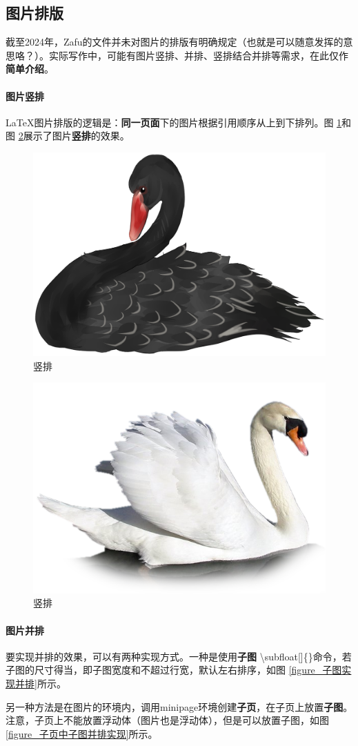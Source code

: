 \documentclass[AutoFakeBold]{ZafuThesis}
\begin{document}
\subsection{图片排版}
截至2024年，Zafu的文件并未对图片的排版有明确规定（也就是可以随意发挥的意思咯？）。实际写作中，可能有图片竖排、并排、竖排结合并排等需求，在此仅作\textbf{简单介绍}。
\paragraph{图片竖排}
\LaTeX 图片排版的逻辑是：\textbf{同一页面}下的图片根据引用顺序从上到下排列。图 \ref{figures_sp0}和图 \ref{figures_sp1}展示了图片\textbf{竖排}的效果。\par
\begin{figure}[htbp]
  \centering
  \includegraphics[width=0.26\columnwidth]{figures/黑天鹅}
  \caption{竖排}
  \label{figures_sp0}
\end{figure}
\begin{figure}[htbp]
  \centering
  \includegraphics[width=0.3\columnwidth]{figures/白天鹅}
  \caption{竖排}
  \label{figures_sp1}
\end{figure}

\paragraph{图片并排}
要实现并排的效果，可以有两种实现方式。一种是使用\textbf{子图} \textbackslash subfloat[]\{\}命令，若子图的尺寸得当，即子图宽度和不超过行宽，默认左右排序，如图 \ref{figure_子图实现并排}所示。\par
另一种方法是在图片的环境内，调用minipage环境创建\textbf{子页}，在子页上放置\textbf{子图}。注意，子页上不能放置浮动体（图片也是浮动体），但是可以放置子图，如图 \ref{figure_子页中子图并排实现}所示。\par
\end{document}
